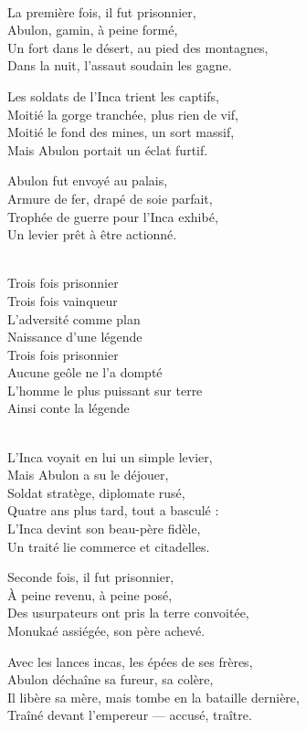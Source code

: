 \begin{lyrics}
\\
La première fois, il fut prisonnier,\\
Abulon, gamin, à peine formé,\\
Un fort dans le désert, au pied des montagnes,\\
Dans la nuit, l'assaut soudain les gagne.

Les soldats de l'Inca trient les captifs,\\
Moitié la gorge tranchée, plus rien de vif,\\
Moitié le fond des mines, un sort massif,\\
Mais Abulon portait un éclat furtif.

Abulon fut envoyé au palais,\\
Armure de fer, drapé de soie parfait,\\
Trophée de guerre pour l'Inca exhibé,\\
Un levier prêt à être actionné.

\\
Trois fois prisonnier\\
Trois fois vainqueur\\
L'adversité comme plan\\
Naissance d'une légende\\
Trois fois prisonnier\\
Aucune geôle ne l'a dompté\\
L'homme le plus puissant sur terre\\
Ainsi conte la légende

\\
L'Inca voyait en lui un simple levier,\\
Mais Abulon a su le déjouer,\\
Soldat stratège, diplomate rusé,\\
Quatre ans plus tard, tout a basculé :\\
L'Inca devint son beau-père fidèle,\\
Un traité lie commerce et citadelles.

Seconde fois, il fut prisonnier,\\
À peine revenu, à peine posé,\\
Des usurpateurs ont pris la terre convoitée,\\
Monukaé assiégée, son père achevé.

Avec les lances incas, les épées de ses frères,\\
Abulon déchaîne sa fureur, sa colère,\\
Il libère sa mère, mais tombe en la bataille dernière,\\
Traîné devant l'empereur — accusé, traître.


\end{lyrics}
